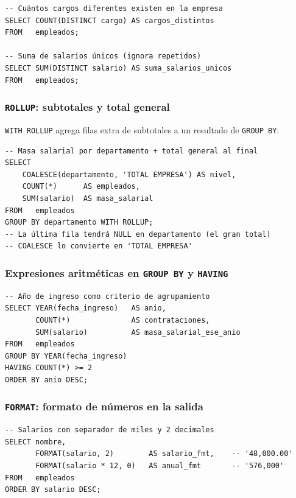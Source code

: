 \begin{lstlisting}[caption={DISTINCT dentro de funciones de agregación.}]
-- Cuántos cargos diferentes existen en la empresa
SELECT COUNT(DISTINCT cargo) AS cargos_distintos
FROM   empleados;

-- Suma de salarios únicos (ignora repetidos)
SELECT SUM(DISTINCT salario) AS suma_salarios_unicos
FROM   empleados;
\end{lstlisting}

\subsubsection{\texttt{ROLLUP}: subtotales y total general}

\texttt{WITH ROLLUP} agrega filas extra de subtotales a un
resultado de \texttt{GROUP BY}:

\begin{lstlisting}[caption={GROUP BY con ROLLUP para subtotales.}]
-- Masa salarial por departamento + total general al final
SELECT
    COALESCE(departamento, 'TOTAL EMPRESA') AS nivel,
    COUNT(*)      AS empleados,
    SUM(salario)  AS masa_salarial
FROM   empleados
GROUP BY departamento WITH ROLLUP;
-- La última fila tendrá NULL en departamento (el gran total)
-- COALESCE lo convierte en 'TOTAL EMPRESA'
\end{lstlisting}

\subsubsection{Expresiones aritméticas en \texttt{GROUP BY} y \texttt{HAVING}}

\begin{lstlisting}[caption={Expresiones calculadas combinadas con agrupamiento.}]
-- Año de ingreso como criterio de agrupamiento
SELECT YEAR(fecha_ingreso)   AS anio,
       COUNT(*)              AS contrataciones,
       SUM(salario)          AS masa_salarial_ese_anio
FROM   empleados
GROUP BY YEAR(fecha_ingreso)
HAVING COUNT(*) >= 2
ORDER BY anio DESC;
\end{lstlisting}

\subsubsection{\texttt{FORMAT}: formato de números en la salida}

\begin{lstlisting}[caption={FORMAT para presentación de números.}]
-- Salarios con separador de miles y 2 decimales
SELECT nombre,
       FORMAT(salario, 2)        AS salario_fmt,    -- '48,000.00'
       FORMAT(salario * 12, 0)   AS anual_fmt       -- '576,000'
FROM   empleados
ORDER BY salario DESC;
\end{lstlisting}

